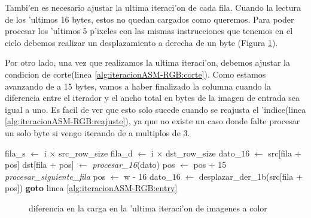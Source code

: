 Tambi'en es necesario ajustar la ultima iteraci'on de cada fila. Cuando la lectura de los 'ultimos 16 bytes, estos no quedan cargados como queremos. Para poder procesar los 'ultimos 5 p'ixeles con las mismas instrucciones que tenemos en el ciclo debemos realizar un desplazamiento a derecha de un byte (Figura \ref{est:ciclo}).

Por otro lado, una vez que realizamos la ultima iteraci'on, debemos ajustar la condicion de corte(linea \ref{alg:iteracionASM-RGB:corte}). Como estamos avanzando de a 15 bytes, vamos a haber finalizado la columna cuando la diferencia entre el iterador y el ancho total en bytes de la imagen de entrada sea igual a uno. Es facil de ver que esto solo sucede cuando se reajusta el 'indice(linea \ref{alg:iteracionASM-RGB:reajuste}), ya que no existe un caso donde falte procesar un solo byte si vengo iterando de a multiplos de 3.

\begin{algorithm}[h!]
\caption{}\label{alg:iteracionASM-RGB}
\begin{algorithmic}[1]
	\STATE fila_s $\leftarrow$ i $\times$ src\_row\_size	
	\STATE fila_d $\leftarrow$ i $\times$ dst\_row\_size
		\STATE dato_{$16$} $\leftarrow$ src[fila + pos]
		\STATE dst[fila + pos] $\leftarrow$ \textit{procesar_{16}}(dato)
		\label{alg:iteracionASM-RGB:entry}
		\STATE pos $\leftarrow$ pos + 15		
		 		\label{alg:iteracionASM-RGB:corte}
			\STATE \textit{procesar\_siguiente\_fila}
			\STATE pos $\leftarrow$ w - 16 \label{alg:iteracionASM-RGB:reajuste}
			\STATE dato_{$16$} $\leftarrow$ desplazar\_der_{1b}(src[fila + pos]) 
			\STATE \textbf{goto} linea \ref{alg:iteracionASM-RGB:entry}
		\ENDIF		
	\ENDFOR
\ENDFOR
\end{algorithmic}
\end{algorithm}


\begin{figure}[hb]
\caption{diferencia en la carga en la 'ultima iteraci'on de imagenes a color}
\label{est:ciclo}
\end{figure}

